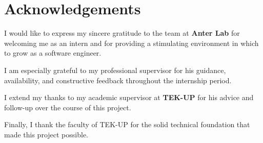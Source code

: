 
\chapter*{Acknowledgements}

I would like to express my sincere gratitude to the team at \textbf{Anter Lab} for
welcoming me as an intern and for providing a stimulating environment in which to
grow as a software engineer.

I am especially grateful to my professional supervisor for his guidance, availability,
and constructive feedback throughout the internship period.

I extend my thanks to my academic supervisor at \textbf{TEK-UP} for his advice and
follow-up over the course of this project.

Finally, I thank the faculty of TEK-UP for the solid technical foundation that made
this project possible.
